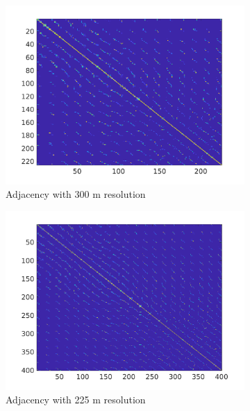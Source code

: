 \begin{figure}[H]
\begin{subfigure}{0.48\textwidth}
\centering
\includegraphics[width=\textwidth]{dem_figs/colima_adjacency_300}
\caption{Adjacency with 300 m resolution}
\label{colima_adjacency_300}
\end{subfigure}
\centering
\begin{subfigure}{0.48\textwidth}
\includegraphics[width=\textwidth]{dem_figs/colima_adjacency_225}
\caption{Adjacency with 225 m resolution}
\label{colima_adjacency_225}
\end{subfigure} \\
\begin{subfigure}{0.48\textwidth}
\centering

\end{subfigure}
\end{figure}
